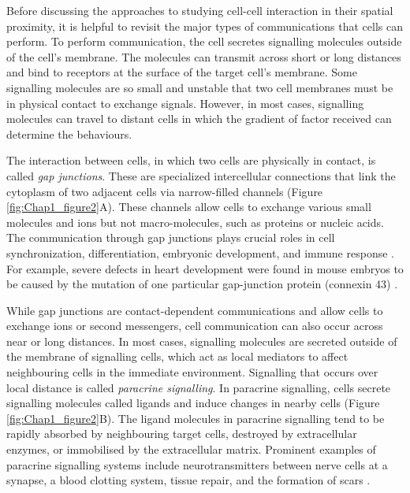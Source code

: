 Before discussing the approaches to studying cell-cell interaction in their spatial proximity, it is helpful to revisit the major types of communications that cells can perform. To perform communication, the cell secretes signalling molecules outside of the cell's membrane. The molecules can transmit across short or long distances and bind to receptors at the surface of the target cell's membrane. Some signalling molecules are so small and unstable that two cell membranes must be in physical contact to exchange signals. However, in most cases, signalling molecules can travel to distant cells in which the gradient of factor received can determine the behaviours.         

The interaction between cells, in which two cells are physically in contact, is called \textit{gap junctions}. These are specialized intercellular connections that link the cytoplasm of two adjacent cells via narrow-filled channels (Figure \ref{fig:Chap1_figure2}A). These channels allow cells to exchange various small molecules and ions but not macro-molecules, such as proteins or nucleic acids. The communication through gap junctions plays crucial roles in cell synchronization, differentiation, embryonic development, and immune response \cite{white1999genetic, vinken2006connexins}. For example, severe defects in heart development were found in mouse embryos to be caused by the mutation of one particular gap-junction protein (connexin 43) \cite{alberts2018molecular}.

While gap junctions are contact-dependent communications and allow cells to exchange ions or second messengers, cell communication can also occur across near or long distances. In most cases, signalling molecules are secreted outside of the membrane of signalling cells, which act as local mediators to affect neighbouring cells in the immediate environment. Signalling that occurs over local distance is called \textit{paracrine signalling}. In paracrine signalling, cells secrete signalling molecules called ligands and induce changes in nearby cells (Figure \ref{fig:Chap1_figure2}B). The ligand molecules in paracrine signalling tend to be rapidly absorbed by neighbouring target cells, destroyed by extracellular enzymes, or immobilised by the extracellular matrix. Prominent examples of paracrine signalling systems include neurotransmitters between nerve cells at a synapse, a blood clotting system, tissue repair, and the formation of scars
\cite{huang1998gap}. 

